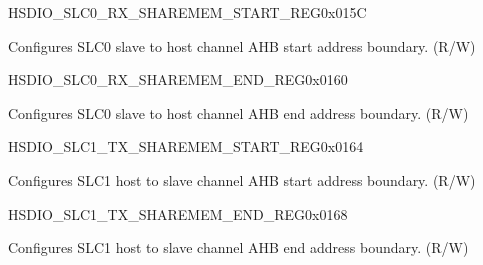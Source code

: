 \begin{register}{H}{SDIO\_SLC0\_RX\_SHAREMEM\_START\_REG}{0x015C}\label{regdesc:SDIOSLC0RXSHAREMEMSTARTREG}
%
\regnewline%
\begin{regdesc}\begin{reglist}
\label{fielddesc:SDIOSDIOSLC0RXSHAREMEMSTARTADDR}\item [SDIO\_SDIO\_SLC0\_RX\_SHAREMEM\_START\_ADDR] Configures SLC0 slave to host channel AHB start address boundary. (R/W)
\end{reglist}\end{regdesc}
\end{register}


\begin{register}{H}{SDIO\_SLC0\_RX\_SHAREMEM\_END\_REG}{0x0160}\label{regdesc:SDIOSLC0RXSHAREMEMENDREG}
%
\regnewline%
\begin{regdesc}\begin{reglist}
\label{fielddesc:SDIOSDIOSLC0RXSHAREMEMENDADDR}\item [SDIO\_SDIO\_SLC0\_RX\_SHAREMEM\_END\_ADDR] Configures SLC0 slave to host channel AHB end address boundary. (R/W)
\end{reglist}\end{regdesc}
\end{register}


\begin{register}{H}{SDIO\_SLC1\_TX\_SHAREMEM\_START\_REG}{0x0164}\label{regdesc:SDIOSLC1TXSHAREMEMSTARTREG}
%
\regnewline%
\begin{regdesc}\begin{reglist}
\label{fielddesc:SDIOSDIOSLC1TXSHAREMEMSTARTADDR}\item [SDIO\_SDIO\_SLC1\_TX\_SHAREMEM\_START\_ADDR] Configures SLC1 host to slave channel AHB start address boundary. (R/W)
\end{reglist}\end{regdesc}
\end{register}


\begin{register}{H}{SDIO\_SLC1\_TX\_SHAREMEM\_END\_REG}{0x0168}\label{regdesc:SDIOSLC1TXSHAREMEMENDREG}
%
\regnewline%
\begin{regdesc}\begin{reglist}
\label{fielddesc:SDIOSDIOSLC1TXSHAREMEMENDADDR}\item [SDIO\_SDIO\_SLC1\_TX\_SHAREMEM\_END\_ADDR] Configures SLC1 host to slave channel AHB end address boundary. (R/W)
\end{reglist}\end{regdesc}
\end{register}



